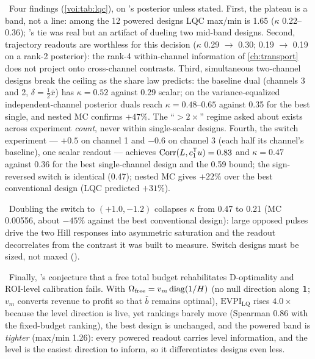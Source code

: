 \tagNumerical\ Four findings (\cref{voi:tab:lqc}), on 's posterior unless stated. First, the plateau is a band, not a line: among the 12 powered designs LQC max/min is 1.65 ($\kappa$ 0.22--0.36); 's tie was real but an artifact of dueling two mid-band designs. Second, trajectory readouts are worthless for this decision ($\kappa$ 0.29 $\to$ 0.30; 0.19 $\to$ 0.19 on a rank-2 posterior): the rank-4 within-channel information of \cref{ch:transport} does not project onto cross-channel contrasts. Third, simultaneous two-channel designs break the ceiling as the share law predicts: the baseline dual (channels 3 and 2, $\delta = \tfrac12\bar x$) has $\kappa = 0.52$ against 0.29 scalar; on the variance-equalized independent-channel posterior duals reach $\kappa = 0.48$--$0.65$ against 0.35 for the best single, and nested MC confirms $+47\%$. The ``$>2\times$'' regime  asked about exists across experiment \emph{count}, never within single-scalar designs. Fourth, the switch experiment --- $+0.5$ on channel 1 and $-0.6$ on channel 3 (each half its channel's baseline), one scalar readout --- achieves $\operatorname{Corr}(L,c_1^{\mathsf{T}} u) = 0.83$ and $\kappa = 0.47$ against 0.36 for the best single-channel design and the 0.59 bound; the sign-reversed switch is identical (0.47); nested MC gives $+22\%$ over the best conventional design (LQC predicted $+31\%$).

\begin{proposition}
\label{voi:prop:collapse}
\tagNumerical\ Doubling the switch to $(+1.0, -1.2)$ collapses $\kappa$ from 0.47 to 0.21 (MC 0.00556, about $-45\%$ against the best conventional design): large opposed pulses drive the two Hill responses into asymmetric saturation and the readout decorrelates from the contrast it was built to measure. Switch designs must be sized, not maxed ().
\end{proposition}

\tagRefuted\ Finally, 's conjecture that a free total budget rehabilitates D-optimality and ROI-level calibration fails. With $\Omega_{\mathrm{free}} = v_m\operatorname{diag}(1/H)$ (no null direction along $\mathbf{1}$; $v_m$ converts revenue to profit so that $\bar b$ remains optimal), $\mathrm{EVPI}_{\mathrm{LQ}}$ rises $4.0\times$ because the level direction is live, yet rankings barely move (Spearman 0.86 with the fixed-budget ranking), the best design is unchanged, and the powered band is \emph{tighter} (max/min 1.26): every powered readout carries level information, and the level is the easiest direction to inform, so it differentiates designs even less.

